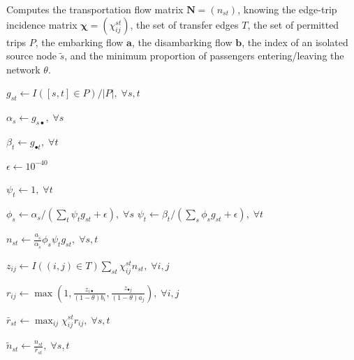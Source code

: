 \documentclass{bmcart}
\begin{document}
\begin{algorithm}[h]
	\caption{Computes the transportation flow matrix $\mathbf{N} = (n_{st})$, knowing the edge-trip incidence matrix $\bm{\chi} = (\chi_{ij}^{st})$, the set of transfer edges $T$, the set of permitted trips $P$, the embarking flow $\mathbf{a}$, the disambarking flow $\mathbf{b}$, the index of an isolated source node $\tilde{s}$, and the minimum proportion of passengers entering/leaving the network $\theta$.}
	\label{algo1}
	\begin{algorithmic}[1]
		\State $g_{st} \leftarrow I([s, t] \in P) / \vert P \vert, \; \forall s,t$ 
		
		\State $\alpha_s \leftarrow g_{s\bullet}, \; \forall s$ 
		
		\State $\beta_t \leftarrow g_{\bullet t}, \; \forall t$ 
		
		\State $\epsilon \leftarrow 10^{-40}$ 
		
		 
		
		\State $\psi_t \leftarrow 1, \; \forall t$
		
		 
		
		\State $\phi_s \leftarrow \alpha_s / (\sum_t \psi_t g_{st} + \epsilon), \; \forall s$
		\State $\psi_t \leftarrow \beta_t / (\sum_s \phi_s g_{st} + \epsilon), \; \forall t$
		
		\EndWhile
		
		\State $n_{st} \leftarrow \frac{a_{\tilde{s}}}{\alpha_{\tilde{s}}} \phi_s \psi_t g_{st}, \; \forall s,t$ 
		
		\State $z_{ij} \leftarrow I((i,j) \in T)\sum_{st} \chi_{ij}^{st} n_{st}, \; \forall i,j$
		
		\State $r_{ij} \leftarrow \max \left(1, \frac{z_{i \bullet}}{(1 - \theta)b_i}, \frac{z_{\bullet j}}{(1 - \theta)a_j} \right), \; \forall i,j$
		
		\State $\bar{r}_{st} \leftarrow \max_{ij} \chi_{ij}^{st} r_{ij}, \; \forall s,t$
		
		\State $\widetilde{n}_{st} \leftarrow \frac{n_{st}}{\bar{r}_{st}}, \; \forall s,t$
		

\end{algorithmic}
\end{algorithm}
\end{document}
